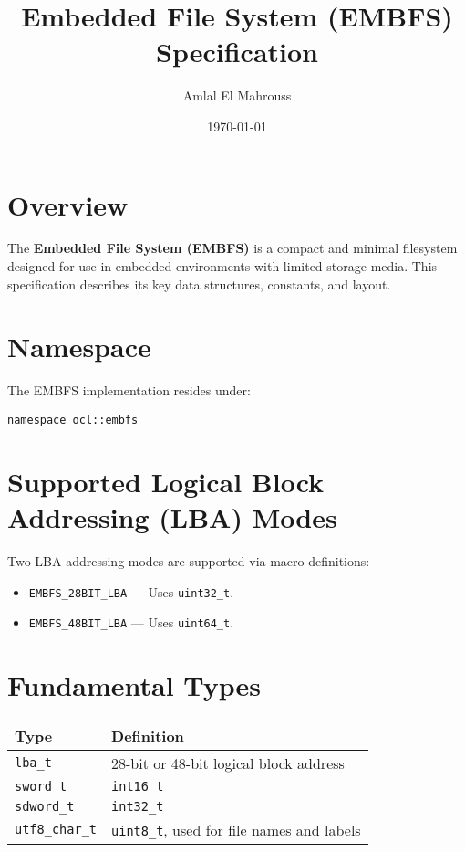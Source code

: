 \documentclass{article}
\title{Embedded File System (EMBFS) Specification}
\author{Amlal El Mahrouss}
\date{\today}
\begin{document}
\maketitle

\section{Overview}
The \textbf{Embedded File System (EMBFS)} is a compact and minimal filesystem designed for use in embedded environments with limited storage media. This specification describes its key data structures, constants, and layout.

\section{Namespace}
The EMBFS implementation resides under:
\begin{lstlisting}
namespace ocl::embfs
\end{lstlisting}

\section{Supported Logical Block Addressing (LBA) Modes}
Two LBA addressing modes are supported via macro definitions:
\begin{itemize}
    \item \texttt{EMBFS\_28BIT\_LBA} — Uses \texttt{uint32\_t}.
    \item \texttt{EMBFS\_48BIT\_LBA} — Uses \texttt{uint64\_t}.
\end{itemize}

\section{Fundamental Types}
\begin{longtable}{|l|l|}
\hline
\textbf{Type} & \textbf{Definition} \\
\hline
\texttt{lba\_t} & 28-bit or 48-bit logical block address \\
\texttt{sword\_t} & \texttt{int16\_t} \\
\texttt{sdword\_t} & \texttt{int32\_t} \\
\texttt{utf8\_char\_t} & \texttt{uint8\_t}, used for file names and labels \\
\hline
\end{longtable}
\end{document}
